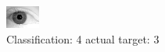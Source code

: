 \begin{figure}[h!]
\begin{center}
\includegraphics[width=0.60\columnwidth]{figures/ID2164_class_4_target_3.png}
\end{center}
\caption{ Classification: 4 actual target: 3}
\label{fig:ID2164_class_4_target_3}
\end{figure}
